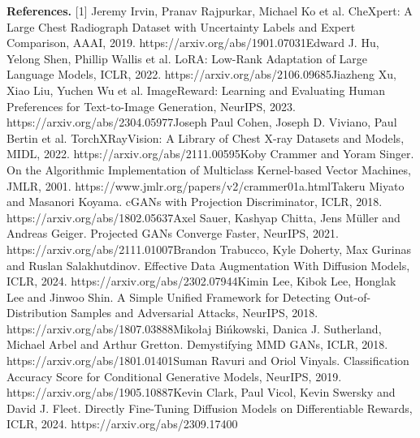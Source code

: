 \documentclass[10pt]{article}
\begin{document}
\vspace{2pt}
{\scriptsize\textbf{References.}
[1] Jeremy Irvin, Pranav Rajpurkar, Michael Ko et al. CheXpert: A Large Chest Radiograph Dataset with Uncertainty Labels and Expert Comparison, AAAI, 2019. https://arxiv.org/abs/1901.07031\;
[2] Edward J. Hu, Yelong Shen, Phillip Wallis et al. LoRA: Low-Rank Adaptation of Large Language Models, ICLR, 2022. https://arxiv.org/abs/2106.09685\;
[3] Jiazheng Xu, Xiao Liu, Yuchen Wu et al. ImageReward: Learning and Evaluating Human Preferences for Text-to-Image Generation, NeurIPS, 2023. https://arxiv.org/abs/2304.05977\;
[4] Joseph Paul Cohen, Joseph D. Viviano, Paul Bertin et al. TorchXRayVision: A Library of Chest X-ray Datasets and Models, MIDL, 2022. https://arxiv.org/abs/2111.00595\;
[5] Koby Crammer and Yoram Singer. On the Algorithmic Implementation of Multiclass Kernel-based Vector Machines, JMLR, 2001. https://www.jmlr.org/papers/v2/crammer01a.html\;
[6] Takeru Miyato and Masanori Koyama. cGANs with Projection Discriminator, ICLR, 2018. https://arxiv.org/abs/1802.05637\;
[7] Axel Sauer, Kashyap Chitta, Jens M\"uller and Andreas Geiger. Projected GANs Converge Faster, NeurIPS, 2021. https://arxiv.org/abs/2111.01007\;
[8] Brandon Trabucco, Kyle Doherty, Max Gurinas and Ruslan Salakhutdinov. Effective Data Augmentation With Diffusion Models, ICLR, 2024. https://arxiv.org/abs/2302.07944\;
[9] Kimin Lee, Kibok Lee, Honglak Lee and Jinwoo Shin. A Simple Unified Framework for Detecting Out-of-Distribution Samples and Adversarial Attacks, NeurIPS, 2018. https://arxiv.org/abs/1807.03888\;
[10] Miko{\l}aj Bi\'nkowski, Danica J. Sutherland, Michael Arbel and Arthur Gretton. Demystifying MMD GANs, ICLR, 2018. https://arxiv.org/abs/1801.01401\;
[11] Suman Ravuri and Oriol Vinyals. Classification Accuracy Score for Conditional Generative Models, NeurIPS, 2019. https://arxiv.org/abs/1905.10887\;
[12] Kevin Clark, Paul Vicol, Kevin Swersky and David J. Fleet. Directly Fine-Tuning Diffusion Models on Differentiable Rewards, ICLR, 2024. https://arxiv.org/abs/2309.17400
\par}
\end{document}
